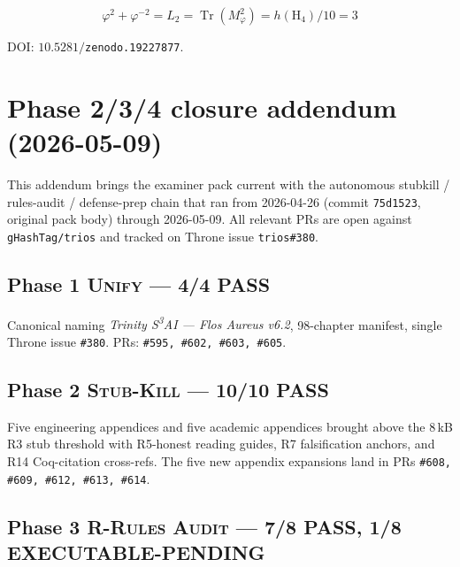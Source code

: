 \[
\boxed{\quad\varphi^{2}+\varphi^{-2}=L_{2}=\operatorname{Tr}(M_{\varphi}^{2})=h(\mathrm{H}_{4})/10=3\quad}
\]

DOI: $10{.}5281/$\texttt{zenodo.19227877}.

\section{Phase 2/3/4 closure addendum (2026-05-09)}

This addendum brings the examiner pack current with the autonomous
stubkill / rules-audit / defense-prep chain that ran from 2026-04-26
(commit \texttt{75d1523}, original pack body) through 2026-05-09. All
relevant PRs are open against \texttt{gHashTag/trios} and tracked on
Throne issue \texttt{trios\#380}.

\subsection*{Phase 1 \textsc{Unify} — 4/4 PASS}

Canonical naming \emph{Trinity S\textsuperscript{3}AI — Flos Aureus
v6.2}, 98-chapter manifest, single Throne issue \texttt{\#380}.
PRs: \texttt{\#595, \#602, \#603, \#605}.

\subsection*{Phase 2 \textsc{Stub-Kill} — 10/10 PASS}

Five engineering appendices and five academic appendices brought above
the 8\,kB R3 stub threshold with R5-honest reading guides, R7
falsification anchors, and R14 Coq-citation cross-refs. The five new
appendix expansions land in PRs \texttt{\#608, \#609, \#612, \#613,
\#614}.

\subsection*{Phase 3 \textsc{R-Rules Audit} — 7/8 PASS, 1/8 EXECUTABLE-PENDING}

